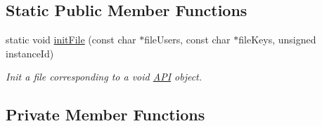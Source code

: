 \subsection*{Static Public Member Functions}
\begin{DoxyCompactItemize}
\item 
static void \hyperlink{classAPI_a93a74bcd90868183773495d9b52dab0a}{init\+File} (const char $\ast$file\+Users, const char $\ast$file\+Keys, unsigned instance\+Id)
\begin{DoxyCompactList}\small\item\em Init a file corresponding to a void \hyperlink{classAPI}{A\+P\+I} object. \end{DoxyCompactList}\end{DoxyCompactItemize}
\subsection*{Private Member Functions}
